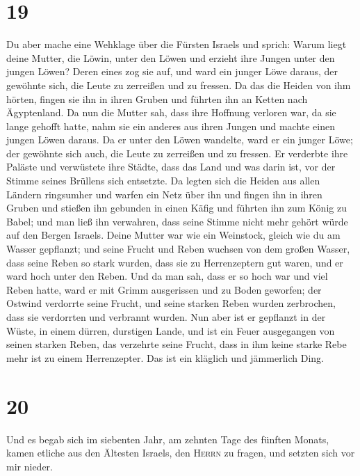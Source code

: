 \hypertarget{section-18}{%
\section{19}\label{section-18}}

 Du aber mache eine Wehklage über die Fürsten Israels
 und sprich: Warum liegt deine Mutter, die Löwin, unter
den Löwen und erzieht ihre Jungen unter den jungen Löwen? 
Deren eines zog sie auf, und ward ein junger Löwe daraus, der gewöhnte
sich, die Leute zu zerreißen und zu fressen.  Da das die
Heiden von ihm hörten, fingen sie ihn in ihren Gruben und führten ihn an
Ketten nach Ägyptenland.  Da nun die Mutter sah, dass ihre
Hoffnung verloren war, da sie lange gehofft hatte, nahm sie ein anderes
aus ihren Jungen und machte einen jungen Löwen daraus.  Da
er unter den Löwen wandelte, ward er ein junger Löwe; der gewöhnte sich
auch, die Leute zu zerreißen und zu fressen.  Er verderbte
ihre Paläste und verwüstete ihre Städte, dass das Land und was darin
ist, vor der Stimme seines Brüllens sich entsetzte.  Da
legten sich die Heiden aus allen Ländern ringsumher und warfen ein Netz
über ihn und fingen ihn in ihren Gruben  und stießen ihn
gebunden in einen Käfig und führten ihn zum König zu Babel; und man ließ
ihn verwahren, dass seine Stimme nicht mehr gehört würde auf den Bergen
Israels.  Deine Mutter war wie ein Weinstock, gleich wie
du am Wasser gepflanzt; und seine Frucht und Reben wuchsen von dem
großen Wasser,  dass seine Reben so stark wurden, dass
sie zu Herrenzeptern gut waren, und er ward hoch unter den Reben. Und da
man sah, dass er so hoch war und viel Reben hatte,  ward
er mit Grimm ausgerissen und zu Boden geworfen; der Ostwind verdorrte
seine Frucht, und seine starken Reben wurden zerbrochen, dass sie
verdorrten und verbrannt wurden.  Nun aber ist er
gepflanzt in der Wüste, in einem dürren, durstigen Lande,
 und ist ein Feuer ausgegangen von seinen starken Reben,
das verzehrte seine Frucht, dass in ihm keine starke Rebe mehr ist zu
einem Herrenzepter. Das ist ein kläglich und jämmerlich Ding.

\hypertarget{section-19}{%
\section{20}\label{section-19}}

 Und es begab sich im siebenten Jahr, am zehnten Tage des
fünften Monats, kamen etliche aus den Ältesten Israels, den
\textsc{Herrn} zu fragen, und setzten sich vor mir nieder.

